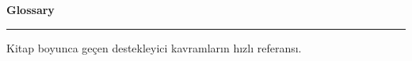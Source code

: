 \clearpage
{}
\noindent{}\par
\vspace{2pt}
{\sffamily\bfseries\fontsize{25}{28}\selectfont Glossary\par}
\vspace{2pt}\textcolor{accent}{\rule{34mm}{2pt}}\par
\vspace{4pt}
{\color{softgray}\small Kitap boyunca geçen destekleyici kavramların hızlı referansı.}

\newcommand{\glsgrp}[1]{\vspace{7pt}\par\noindent
  {\sffamily\bfseries\footnotesize\color{accentdk}\MakeUppercase{#1}}\par
  \vspace{-2pt}\textcolor{hairline}{\rule{\linewidth}{0.6pt}}\vspace{1pt}}

